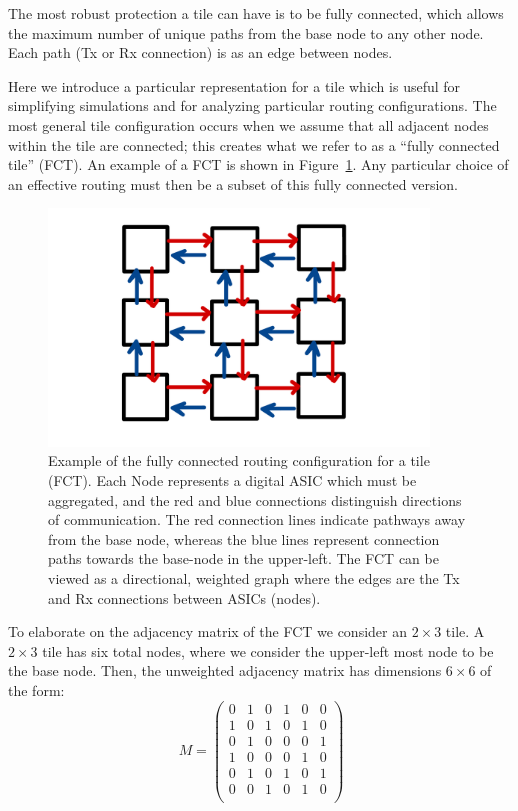 The most robust protection a tile can have is to be fully connected, which allows the maximum number of unique paths from the base node to any other node.
Each path (Tx or Rx connection) is as an edge between nodes.

Here we introduce a particular representation for a tile which is useful for simplifying simulations and for analyzing particular routing configurations.
The most general tile configuration occurs when we assume that all adjacent nodes within the tile are connected; this creates what we refer to as a ``fully connected tile'' (FCT).
An example of a FCT is shown in Figure~\ref{fig:fc_tile}.
Any particular choice of an effective routing must then be a subset of this fully connected version.

\begin{figure}[]
\centering
\includegraphics[width=0.9\textwidth]{images/Broadcast.pdf}
\caption{Example of the fully connected routing configuration for a tile (FCT).
Each Node represents a digital ASIC which must be aggregated, and the red and blue connections distinguish directions of communication.
The red connection lines indicate pathways away from the base node, whereas the blue lines represent connection paths towards the base-node in the upper-left.
The FCT can be viewed as a directional, weighted graph where the edges are the Tx and Rx connections between ASICs (nodes).
}
\label{fig:fc_tile}
\end{figure}

To elaborate on the adjacency matrix of the FCT we consider an $2\times 3$ tile.
A $2\times 3$ tile has six total nodes, where we consider the upper-left most node to be the base node.
Then, the unweighted adjacency matrix has dimensions $6\times6$ of the form:
\begin{equation}~\label{eq:adjacency_matr}
M =
 \begin{pmatrix}
 0 & 1 & 0 & 1 & 0 & 0 \\
 1 & 0 & 1 & 0 & 1 & 0 \\
 0 & 1 & 0 & 0 & 0 & 1 \\
 1 & 0 & 0 & 0 & 1 & 0 \\
 0 & 1 & 0 & 1 & 0 & 1 \\
 0 & 0 & 1 & 0 & 1 & 0 \\
 \end{pmatrix}
\end{equation}

